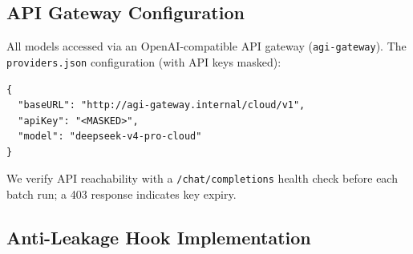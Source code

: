 \subsection{API Gateway Configuration}
\label{sec:api-config}

All models accessed via an OpenAI-compatible API gateway (\texttt{agi-gateway}). The \texttt{providers.json} configuration (with API keys masked):
{\scriptsize\begin{verbatim}
{
  "baseURL": "http://agi-gateway.internal/cloud/v1",
  "apiKey": "<MASKED>",
  "model": "deepseek-v4-pro-cloud"
}
\end{verbatim}}
We verify API reachability with a \texttt{/chat/completions} health check before each batch run; a 403 response indicates key expiry.

\subsection{Anti-Leakage Hook Implementation}
\label{sec:hook-impl}

